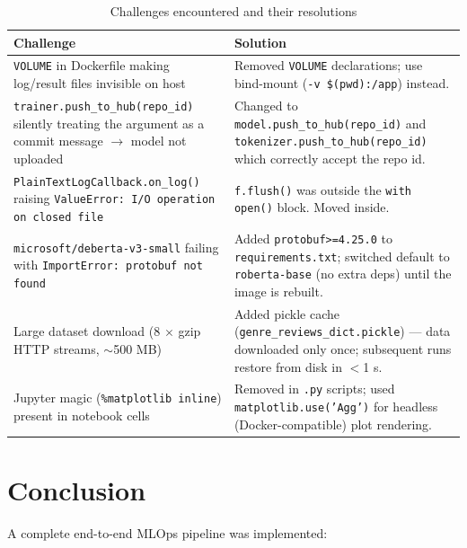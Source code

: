 \documentclass[12pt,a4paper]{article}
\begin{document}
\begin{table}[h]
\centering
\begin{tabular}{p{5.5cm}p{9cm}}
\toprule
\textbf{Challenge} & \textbf{Solution} \\
\midrule
\texttt{VOLUME} in Dockerfile making log/result files invisible on host &
    Removed \texttt{VOLUME} declarations; use bind-mount (\texttt{-v \$(pwd):/app}) instead. \\
\addlinespace
\texttt{trainer.push\_to\_hub(repo\_id)} silently treating the argument as a
commit message $\rightarrow$ model not uploaded &
    Changed to \texttt{model.push\_to\_hub(repo\_id)} and
    \texttt{tokenizer.push\_to\_hub(repo\_id)} which correctly accept the repo id. \\
\addlinespace
\texttt{PlainTextLogCallback.on\_log()} raising \texttt{ValueError: I/O operation on closed file} &
    \texttt{f.flush()} was outside the \texttt{with open()} block.  Moved inside. \\
\addlinespace
\texttt{microsoft/deberta-v3-small} failing with \texttt{ImportError: protobuf not found} &
    Added \texttt{protobuf>=4.25.0} to \texttt{requirements.txt}; switched default
    to \texttt{roberta-base} (no extra deps) until the image is rebuilt. \\
\addlinespace
Large dataset download (8 $\times$ gzip HTTP streams, $\sim$500 MB) &
    Added pickle cache (\texttt{genre\_reviews\_dict.pickle}) — data downloaded
    only once; subsequent runs restore from disk in $<$1 s. \\
\addlinespace
Jupyter magic (\texttt{\%matplotlib inline}) present in notebook cells &
    Removed in \texttt{.py} scripts; used \texttt{matplotlib.use('Agg')} for
    headless (Docker-compatible) plot rendering. \\
\bottomrule
\end{tabular}
\caption{Challenges encountered and their resolutions}
\end{table}

\section{Conclusion}

A complete end-to-end MLOps pipeline was implemented:
\end{document}
